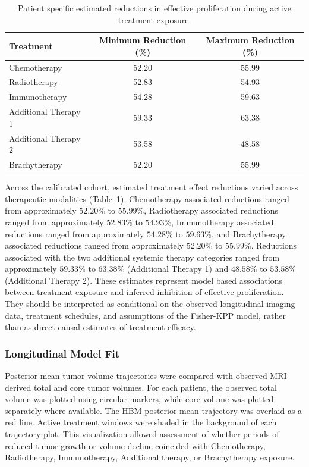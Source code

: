 \begin{table}[htbp]
\centering
\caption{Patient specific estimated reductions in effective proliferation during active treatment exposure.}
\label{tab:hbm_treatment_effects}
\begin{tabular}{lcc}
\hline
\textbf{Treatment} & \textbf{Minimum Reduction (\%)} & \textbf{Maximum Reduction (\%)} \\
\hline
Chemotherapy & 52.20 & 55.99 \\
Radiotherapy & 52.83 & 54.93 \\
Immunotherapy & 54.28 & 59.63 \\
Additional Therapy 1 & 59.33 & 63.38 \\
Additional Therapy 2 & 53.58 & 48.58 \\
Brachytherapy & 52.20 & 55.99 \\
\hline
\end{tabular}
\end{table}

Across the calibrated cohort, estimated treatment effect reductions varied across therapeutic modalities (Table~\ref{tab:hbm_treatment_effects}). Chemotherapy associated reductions ranged from approximately $52.20\%$ to $55.99\%$, Radiotherapy associated reductions ranged from approximately $52.83\%$ to $54.93\%$, Immunotherapy associated reductions ranged from approximately $54.28\%$ to $59.63\%$, and Brachytherapy associated reductions ranged from approximately $52.20\%$ to $55.99\%$. Reductions associated with the two additional systemic therapy categories ranged from approximately $59.33\%$ to $63.38\%$ (Additional Therapy 1) and $48.58\%$ to $53.58\%$ (Additional Therapy 2). These estimates represent model based associations between treatment exposure and inferred inhibition of effective proliferation. They should be interpreted as conditional on the observed longitudinal imaging data, treatment schedules, and assumptions of the Fisher-KPP model, rather than as direct causal estimates of treatment efficacy.

\subsubsection{Longitudinal Model Fit}

Posterior mean tumor volume trajectories were compared with observed MRI derived total and core tumor volumes. For each patient, the observed total volume was plotted using circular markers, while core volume was plotted separately where available. The HBM posterior mean trajectory was overlaid as a red line. Active treatment windows were shaded in the background of each trajectory plot. This visualization allowed assessment of whether periods of reduced tumor growth or volume decline coincided with Chemotherapy, Radiotherapy, Immunotherapy, Additional therapy, or Brachytherapy exposure.

